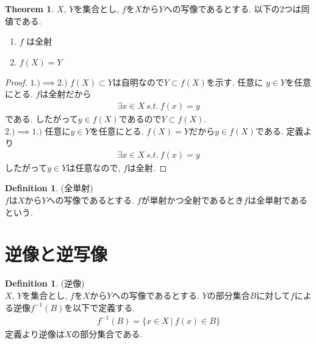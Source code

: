 \documentclass[11pt, a4paper, dvipdfmx]{jsbook}
\theoremstyle{definition}
\newtheorem{Definition+}[Axiom+]{Definition}
\newtheorem{Theorem+}[Axiom+]{Theorem}
\begin{document}
\begin{Theorem+}
  $X$, $Y$を集合とし, $f$を$X$から$Y$への写像であるとする. 以下の2つは同値である.
  \begin{enumerate}
    \item $f$ は全射
    \item $f(X) = Y$
  \end{enumerate}
  \begin{proof}
    $1.)\implies 2.)$ $f(X)\subset Y$は自明なので$Y\subset f(X)$を示す. 任意に
    $y\in Y$を任意にとる. $f$は全射だから
    \begin{align*}
      \exists x\in X~s.t.~ f(x) = y
    \end{align*}
    である. したがって$y\in f(X)$であるので$Y\subset f(X)$.\\
    $2.)\implies 1.)$ 任意に$y\in Y$を任意にとる. $f(X) = Y$だから$y\in f(X)$である. 定義より
    \begin{align*}
      \exists x\in X~s.t.~ f(x) = y
    \end{align*}
    したがって$y\in Y$は任意なので, $f$は全射.
  \end{proof}
\end{Theorem+}
\begin{Definition+}(全単射)\\
  $f$は$X$から$Y$への写像であるとする.
  $f$が単射かつ全射であるとき$f$は全単射であるという.
\end{Definition+}
\section{逆像と逆写像}
\begin{Definition+}(逆像)\\
  $X$, $Y$を集合とし, $f$を$X$から$Y$への写像であるとする. $Y$の部分集合$B$に対して$f$による逆像$f^{-1}(B)$を以下で定義する.
  \begin{align*}
    f^{-1}(B) = \{x\in X~|~f(x)\in B\}
  \end{align*}
  定義より逆像は$X$の部分集合である.  
\end{Definition+}
\end{document}

